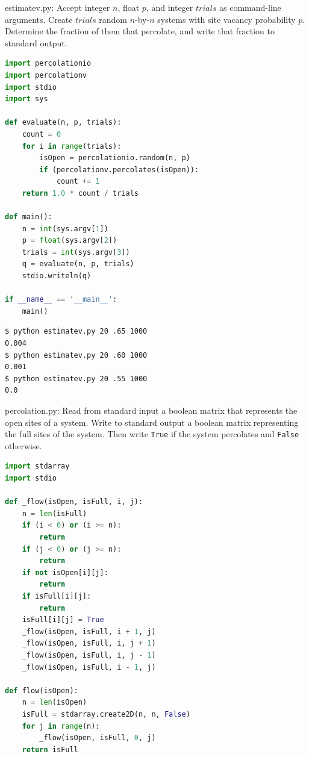 \documentclass[8pt,a4paper,compress,handout]{beamer}
\begin{document}
\begin{frame}[fragile]
\begin{framed}
\tiny estimatev.py: Accept integer $n$, float $p$, and integer $trials$ as command-line arguments. Create $trials$ random $n$-by-$n$ systems with site vacancy probability $p$. Determine the fraction of them that percolate, and
write that fraction to standard output.
\end{framed}

\begin{lstlisting}[language=Python]
import percolationio
import percolationv
import stdio
import sys

def evaluate(n, p, trials):
    count = 0
    for i in range(trials):
        isOpen = percolationio.random(n, p)
        if (percolationv.percolates(isOpen)):
            count += 1
    return 1.0 * count / trials

def main():
    n = int(sys.argv[1])
    p = float(sys.argv[2])
    trials = int(sys.argv[3])
    q = evaluate(n, p, trials)
    stdio.writeln(q)
    
if __name__ == '__main__': 
    main()
\end{lstlisting}

\begin{lstlisting}[language={}]
$ python estimatev.py 20 .65 1000
0.004
$ python estimatev.py 20 .60 1000
0.001
$ python estimatev.py 20 .55 1000
0.0
\end{lstlisting}
\end{frame}

\begin{frame}[fragile]
\begin{framed}
\tiny percolation.py: Read from standard input a boolean matrix that represents the open sites of a system. Write to standard output a boolean
matrix representing the full sites of the system. Then write \lstinline{True} if the system percolates and \lstinline{False} otherwise.

\end{framed}

\begin{lstlisting}[language=Python]
import stdarray
import stdio

def _flow(isOpen, isFull, i, j):
    n = len(isFull)
    if (i < 0) or (i >= n):
        return
    if (j < 0) or (j >= n):
        return
    if not isOpen[i][j]:
        return
    if isFull[i][j]:
        return
    isFull[i][j] = True
    _flow(isOpen, isFull, i + 1, j)
    _flow(isOpen, isFull, i, j + 1)
    _flow(isOpen, isFull, i, j - 1)
    _flow(isOpen, isFull, i - 1, j)

def flow(isOpen):
    n = len(isOpen)
    isFull = stdarray.create2D(n, n, False)
    for j in range(n):
        _flow(isOpen, isFull, 0, j)
    return isFull
\end{lstlisting}
\end{frame}
\end{document}
